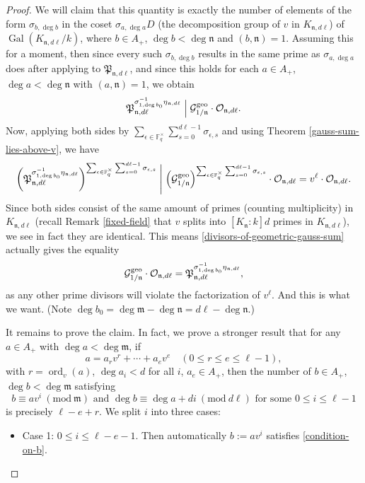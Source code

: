 \documentclass[11pt]{amsart}
\theoremstyle{plain}
\theoremstyle{definition}
\theoremstyle{remark}
\numberwithin{equation}{section}
\newcommand{\FF}{\mathbb{F}}
\newcommand{\mfk}{\mathfrak{m}}
\newcommand{\nfk}{\mathfrak{n}}
\newcommand{\Pfk}{\mathfrak{P}}
\newcommand{\Gcal}{\mathcal{G}}
\newcommand{\Ocal}{\mathcal{O}}
\newcommand{\Gal}{\operatorname{Gal}}
\newcommand{\ord}{\operatorname{ord}}
\newcommand{\Mod}[1]{\ (\mathrm{mod}\ #1)}
\newcommand{\Fqst}{\FF_q^\times}
\newcommand{\bggs}{\Gcal^{\textnormal{geo}}}
\let\l\ell
\begin{document}
\begin{proof}
		We will claim that this quantity is exactly the number of elements of the form $\sigma_{b,\deg b}$ in the coset $\sigma_{a,\deg a}D$ (the decomposition group of $v$ in $K_{\nfk,d\l}$) of $\Gal(K_{\nfk,d\l}/k)$, where $b \in A_+$, $\deg b< \deg \nfk$ and $(b,\nfk) = 1$.
		Assuming this for a moment, then since every such $\sigma_{b,\deg b}$ results in the same prime as $\sigma_{a,\deg a}$ does after applying to $\Pfk_{\nfk,d\l}$, and since this holds for each $a \in A_+$, $\deg a< \deg \nfk$ with $(a,\nfk) = 1$, we obtain
		\begin{equation}      \label{divisors-of-geometric-gauss-sum}
			\Pfk_{\nfk,d\l}^{\sigma_{1,\deg b_0}^{-1} \eta_{\nfk,d\l}}
			\Bigm| 
			\bggs_{1/\nfk} \cdot\Ocal_{\nfk,d\l}.
		\end{equation}
		Now, applying both sides by $\sum_{\epsilon \in\Fqst} \sum_{s=0}^{d\l-1} \sigma_{\epsilon,s}$ and using Theorem \ref{gauss-sum-lies-above-v}, we have
		$$
		\left( \Pfk_{\nfk,d\l}^{\sigma_{1,\deg b_0}^{-1} \eta_{\nfk,d\l}} \right)^{\sum_{\epsilon \in\Fqst} \sum_{s=0}^{d\l-1} \sigma_{\epsilon,s}} 
		\Biggm|
		\left(\bggs_{1/\nfk}\right)^{\sum_{\epsilon \in\Fqst} \sum_{s=0}^{d\l-1} \sigma_{\epsilon,s}} \cdot\Ocal_{\nfk,d\l}
		= v^\l \cdot\Ocal_{\nfk,d\l}.
		$$
		Since both sides consist of the same amount of primes (counting multiplicity) in $K_{\nfk,d\l}$ (recall Remark \ref{fixed-field} that $v$ splits into $[K_{\nfk}:k]d$ primes in $K_{\nfk,d\l}$), we see in fact they are identical.
		This means \eqref{divisors-of-geometric-gauss-sum} actually gives the equality
		$$
		\bggs_{1/\nfk} \cdot\Ocal_{\nfk,d\l}
		= \Pfk_{\nfk,d\l}^{\sigma_{1,\deg b_0}^{-1} \eta_{\nfk,d\l}},
		$$
		as any other prime divisors will violate the factorization of $v^\l$.
		And this is what we want.
		(Note $\deg b_0 = \deg \mfk - \deg \nfk = d\l - \deg\nfk$.)
		
		It remains to prove the claim.
		In fact, we prove a stronger result that for any $a \in A_+$ with $\deg a < \deg \mfk$, if
		$$
		a = a_rv^r + \cdots + a_ev^e
		\quad
		(0 \leq r \leq e \leq \l-1),
		$$
		with $r = \ord_v(a)$, $\deg a_i < d$ for all $i$, $a_e \in A_+$, then the number of $b \in A_+$, $\deg b< \deg \mfk$ satisfying
		\begin{equation}     \label{condition-on-b}
			b \equiv av^i \Mod{\mfk}
			\text{ and }
			\deg b \equiv \deg a + di \Mod{d\l}
			\text{ for some }
			0 \leq i \leq \l-1
		\end{equation}
		is precisely $\l - e + r$.
		We split $i$ into three cases:
		\begin{itemize}
			\item Case 1: $0 \leq i \leq \l-e-1$.
			Then automatically $b := av^i$ satisfies \eqref{condition-on-b}.
			

\end{itemize}
\end{proof}
\end{document}

